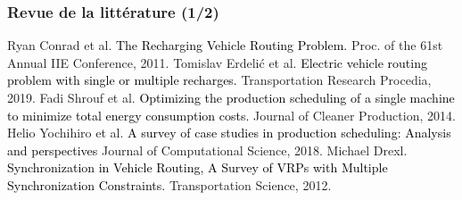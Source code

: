 \documentclass[hyperref={bookmarks=false},aspectratio=169]{beamer}
\begin{document}
\begin{frame}
\frametitle{Revue de la littérature (1/2)}
\vspace{0.01}
{\footnotesize 
\begin{thebibliography}{5}
\begin{enumerate}
    Ryan Conrad et al. %
	\textcolor{black}{The Recharging Vehicle Routing Problem.}
	Proc. of the 61st Annual IIE Conference, 2011.
    Tomislav Erdelić et al. %
	\textcolor{black}{Electric vehicle routing problem with single or multiple recharges.}
	Transportation Research Procedia, 2019.%
    Fadi Shrouf et al. %
	\textcolor{black}{Optimizing the production scheduling of a single machine to minimize total energy consumption costs.}
	Journal of Cleaner Production, 2014.%
    Helio Yochihiro et al. %
	\textcolor{black}{A survey of case studies in production scheduling: Analysis and perspectives}
	Journal of Computational Science, 2018.%
    Michael Drexl. 
    \textcolor{black}{Synchronization in Vehicle Routing, A Survey of VRPs with Multiple Synchronization Constraints.}
   Transportation Science, 2012.%
\end{enumerate}
\end{thebibliography}
}


\end{frame}
\end{document}
